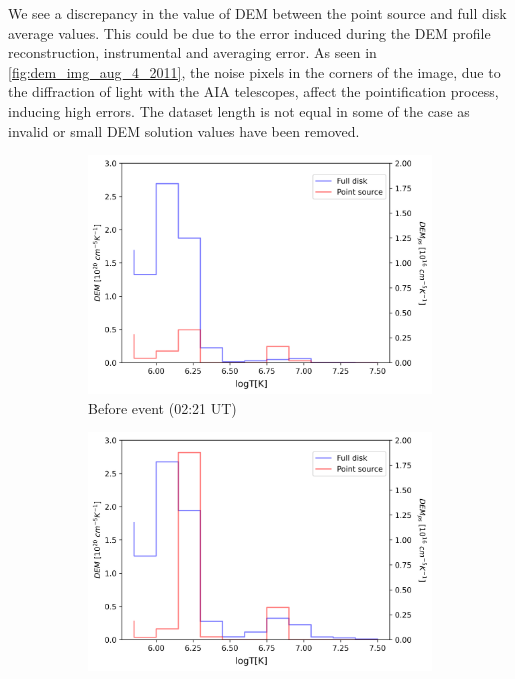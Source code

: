 \label{para:dem_discrepancy}
We see a discrepancy in the value of DEM between the point source and full disk average values. This could be due to the error induced during the DEM profile reconstruction, instrumental and averaging error. As seen in \cref{fig:dem_img_aug_4_2011}, the noise pixels in the corners of the image, due to the diffraction of light with the AIA telescopes, affect the pointification process, inducing high errors. The dataset length is not equal in some of the case as invalid or small DEM solution values have been removed.\\

\begin{figure}[h!]

    \begin{subfigure}[b]{0.3\textwidth}
        \centering
        \includegraphics[width=\textwidth]{images/dem_profile_before_event_2011_aug_04.png}
        \caption{Before event (02:21 UT)}
        \label{fig:dem_pro_aug_04_2011_a}
    \end{subfigure}
    \hfill
    \begin{subfigure}[b]{0.3\textwidth}
        \centering
        \includegraphics[width=\textwidth]{images/dem_profile_during_event_2011_aug_04.png}

\end{subfigure}
\end{figure}
